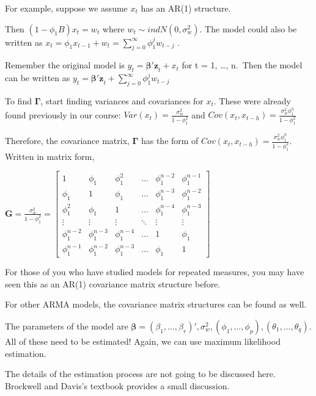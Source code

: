 \documentclass[
]{book}
\theoremstyle{definition}
\theoremstyle{definition}
\theoremstyle{definition}
\theoremstyle{definition}
\theoremstyle{remark}
\begin{document}
For example, suppose we assume \(x_t\) has an AR(1) structure.

Then \((1-\phi_1B)x_t = w_t\) where \(w_t \sim ind N(0, \sigma_w^2)\). The model could also be written as \(x_t = \phi_1x_{t-1} + w_t =\sum_{j=0}^{\infty}\phi_1^jw_{t-j}\) .

Remember the original model is \(y_t = \boldsymbol{\beta'z}_t + x_t\) for t = 1, \ldots, n.~Then the model can be written as \(y_t=\boldsymbol{\beta'z}_t+\sum_{j=0}^{\infty}\phi_1^jw_{t-j}\)

To find \(\boldsymbol \Gamma\), start finding variances and covariances for \(x_t\). These were already found previously in our course: \(Var(x_t)=\frac{\sigma_w^2}{1-\phi_1^2}\) and \(Cov(x_t,x_{t-h})=\frac{\sigma_w^2\phi_1^h}{1-\phi_1^2}\)

Therefore, the covariance matrix, \(\boldsymbol \Gamma\) has the form of \(Cov(x_t, x_{t-h}) =\frac{\sigma_w^2\phi_1^h}{1-\phi_1^2}\). Written in matrix form,

\(\boldsymbol G=\frac{\sigma_w^2}{1-\phi_1^2}=\begin{bmatrix} 1 & \phi_1 & \phi_1^2 & \dots & \phi_1^{n-2} & \phi_1^{n-1} \\ \phi_1 & 1 & \phi_1 & \dots & \phi_1^{n-3} & \phi_1^{n-2} \\ \phi_1^2 & \phi_1 & 1 & \dots & \phi_1^{n-4} & \phi_1^{n-3} \\ \vdots & \vdots & \vdots & \ddots & \vdots & \vdots \\ \phi_1^{n-2} & \phi_1^{n-3} & \phi_1^{n-4} & \dots & 1 & \phi_1 \\ \phi_1^{n-1} & \phi_1^{n-2} & \phi_1^{n-3} & \dots & \phi_1 & 1 \end{bmatrix}\)

For those of you who have studied models for repeated measures, you may have seen this as an AR(1) covariance matrix structure before.

For other ARMA models, the covariance matrix structures can be found as well.

The parameters of the model are \(\boldsymbol \beta = (\beta_1,…,\beta_r)', \sigma_w^2 , (\phi_1,…, \phi_p), (\theta_1,…, \theta_q)\). All of these need to be estimated! Again, we can use maximum likelihood estimation.

The details of the estimation process are not going to be discussed here. Brockwell and Davis's textbook provides a small discussion.
\end{document}
